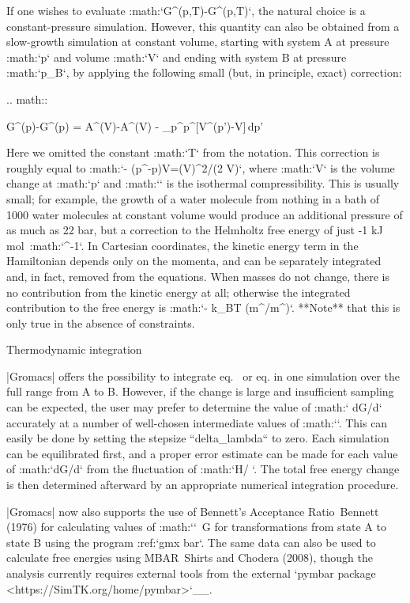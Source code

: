 {If one wishes to evaluate
:math:`G{^{}}(p,T)-G{^{}}(p,T)`, the natural choice
is a constant-pressure simulation. However, this quantity can also be
obtained from a slow-growth simulation at constant volume, starting with
system A at pressure :math:`p` and volume :math:`V` and ending with
system B at pressure :math:`p_B`, by applying the following small (but,
in principle, exact) correction:

.. math::

   G{^{}}(p)-G{^{}}(p) =
   A{^{}}(V)-A{^{}}(V) - \int_p^{p{^{}}}[V{^{}}(p')-V]\,dp'

Here we omitted the constant :math:`T` from the notation. This
correction is roughly equal to
:math:`- (p{^{}}-p)\Delta V=(\Delta V)^2/(2
\kappa V)`, where :math:`\Delta V` is the volume change at :math:`p` and
:math:`\kappa` is the isothermal compressibility. This is usually small;
for example, the growth of a water molecule from nothing in a bath of
1000 water molecules at constant volume would produce an additional
pressure of as much as 22 bar, but a correction to the Helmholtz free
energy of just -1 kJ mol\ :math:`^{-1}`. In Cartesian coordinates, the
kinetic energy term in the Hamiltonian depends only on the momenta, and
can be separately integrated and, in fact, removed from the equations.
When masses do not change, there is no contribution from the kinetic
energy at all; otherwise the integrated contribution to the free energy
is :math:`- k_BT \ln
(m{^{}}/m{^{}})`. **Note** that this is only true in
the absence of constraints.

Thermodynamic integration
~~~~~~~~~~~~~~~~~~~~~~~~~

|Gromacs| offers the possibility to integrate
eq. 
or eq. 
in one
simulation over the full range from A to B. However, if the change is
large and insufficient sampling can be expected, the user may prefer to
determine the value of :math:`\langle
dG/d\lambda \rangle` accurately at a number of well-chosen intermediate
values of :math:`\lambda`. This can easily be done by setting the
stepsize ``delta_lambda`` to zero. Each simulation can be
equilibrated first, and a proper error estimate can be made for each
value of :math:`dG/d\lambda` from the fluctuation of
:math:`\partial H/\partial
\lambda`. The total free energy change is then determined afterward by
an appropriate numerical integration procedure.

|Gromacs| now also supports the use of Bennett’s Acceptance Ratio Bennett
(1976) for calculating values of :math:`\Delta`\ G for transformations
from state A to state B using the program :ref:`gmx bar`. The same data can also be used to
calculate free energies using MBAR Shirts and Chodera (2008), though the
analysis currently requires external tools from the external
`pymbar package <https://SimTK.org/home/pymbar>`__.

}
